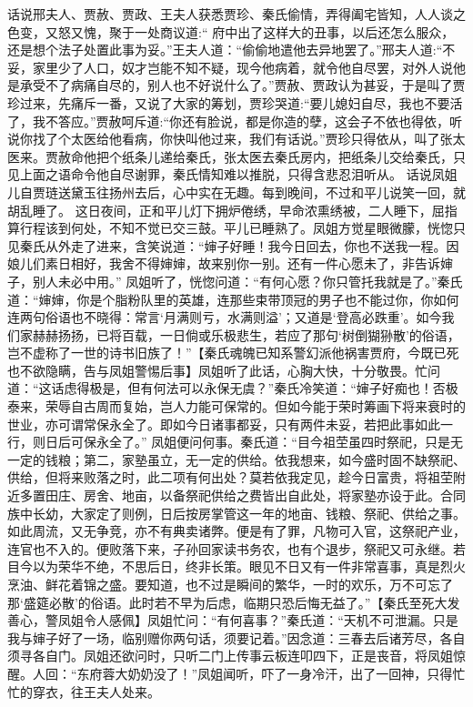 \documentclass[12pt,oneside]{book}
\begin{document}
话说邢夫人、贾赦、贾政、王夫人获悉贾珍、秦氏偷情，弄得阖宅皆知，人人谈之色变，又怒又愧，聚于一处商议道:“ 府中出了这样大的丑事，以后还怎么服众，还是想个法子处置此事为妥。”王夫人道：“偷偷地遣他去异地罢了。”邢夫人道:“不妥，家里少了人口，奴才岂能不知不疑，现今他病着，就令他自尽罢，对外人说他是承受不了病痛自尽的，别人也不好说什么了。”贾赦、贾政认为甚妥，于是叫了贾珍过来，先痛斥一番，又说了大家的筹划，贾珍哭道:“要儿媳妇自尽，我也不要活了，我不答应。”贾赦呵斥道:“你还有脸说，都是你造的孽，这会子不依也得依，听说你找了个太医给他看病，你快叫他过来，我们有话说。”贾珍只得依从，叫了张太医来。贾赦命他把个纸条儿递给秦氏，张太医去秦氏房内，把纸条儿交给秦氏，只见上面之语命令他自尽谢罪，秦氏情知难以推脱，只得含悲忍泪听从。
话说凤姐儿自贾琏送黛玉往扬州去后，心中实在无趣。每到晚间，不过和平儿说笑一回，就胡乱睡了。
这日夜间，正和平儿灯下拥炉倦绣，早命浓熏绣被，二人睡下，屈指算行程该到何处，不知不觉已交三鼓。平儿已睡熟了。凤姐方觉星眼微朦，恍惚只见秦氏从外走了进来，含笑说道：“婶子好睡！我今日回去，你也不送我一程。因娘儿们素日相好，我舍不得婶婶，故来别你一别。还有一件心愿未了，非告诉婶子，别人未必中用。”
凤姐听了，恍惚问道：“有何心愿？你只管托我就是了。”秦氏道：“婶婶，你是个脂粉队里的英雄，连那些束带顶冠的男子也不能过你，你如何连两句俗语也不晓得：常言‘月满则亏，水满则溢’；又道是‘登高必跌重’。如今我们家赫赫扬扬，已将百载，一日倘或乐极悲生，若应了那句‘树倒猢狲散’的俗语，岂不虚称了一世的诗书旧族了！”【秦氏魂魄已知系警幻派他祸害贾府，今既已死也不欲隐瞒，告与凤姐警惕后事】凤姐听了此话，心胸大快，十分敬畏。忙问道：“这话虑得极是，但有何法可以永保无虞？”秦氏冷笑道：“婶子好痴也！否极泰来，荣辱自古周而复始，岂人力能可保常的。但如今能于荣时筹画下将来衰时的世业，亦可谓常保永全了。即如今日诸事都妥，只有两件未妥，若把此事如此一行，则日后可保永全了。”
凤姐便问何事。秦氏道：“目今祖茔虽四时祭祀，只是无一定的钱粮；第二，家塾虽立，无一定的供给。依我想来，如今盛时固不缺祭祀、供给，但将来败落之时，此二项有何出处？莫若依我定见，趁今日富贵，将祖茔附近多置田庄、房舍、地亩，以备祭祀供给之费皆出自此处，将家塾亦设于此。合同族中长幼，大家定了则例，日后按房掌管这一年的地亩、钱粮、祭祀、供给之事。如此周流，又无争竞，亦不有典卖诸弊。便是有了罪，凡物可入官，这祭祀产业，连官也不入的。便败落下来，子孙回家读书务农，也有个退步，祭祀又可永继。若目今以为荣华不绝，不思后日，终非长策。眼见不日又有一件非常喜事，真是烈火烹油、鲜花着锦之盛。要知道，也不过是瞬间的繁华，一时的欢乐，万不可忘了那‘盛筵必散’的俗语。此时若不早为后虑，临期只恐后悔无益了。”【秦氏至死大发善心，警凤姐令人感佩】凤姐忙问：“有何喜事？”秦氏道：“天机不可泄漏。只是我与婶子好了一场，临别赠你两句话，须要记着。”因念道：三春去后诸芳尽，各自须寻各自门。凤姐还欲问时，只听二门上传事云板连叩四下，正是丧音，将凤姐惊醒。人回：“东府蓉大奶奶没了！”凤姐闻听，吓了一身冷汗，出了一回神，只得忙忙的穿衣，往王夫人处来。
\end{document}

